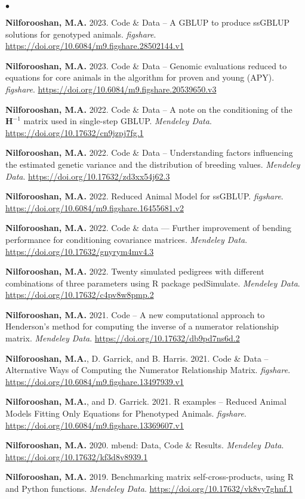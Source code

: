 \documentclass[margin,line]{res}
\newenvironment{list2}{
  \begin{list}{$\bullet$}{%
    \setlength{\itemsep}{0in}
    \setlength{\parsep}{0in} \setlength{\parskip}{0in}
    \setlength{\topsep}{0in} \setlength{\partopsep}{0in}
    \setlength{\leftmargin}{0.2in}}}
  {\end{list}}
\begin{document}
\begin{resume}
  \begin{list2}
    \item {\bf Nilforooshan, M.A.} 2023. Code \& Data -- A GBLUP to produce ssGBLUP solutions for genotyped animals. {\em figshare}. \url{https://doi.org/10.6084/m9.figshare.28502144.v1}
    \item {\bf Nilforooshan, M.A.} 2023. Code \& Data -- Genomic evaluations reduced to equations for core animals in the algorithm for proven and young (APY). {\em figshare}. \url{https://doi.org/10.6084/m9.figshare.20539650.v3}
    \item {\bf Nilforooshan, M.A.} 2022. Code \& Data -- A note on the conditioning of the $\mathbf H^{-1}$ matrix used in single-step GBLUP. {\em Mendeley Data}. \url{https://doi.org/10.17632/cn9jzpj7fg.1}
    \item {\bf Nilforooshan, M.A.} 2022. Code \& Data -- Understanding factors influencing the estimated genetic variance and the distribution of breeding values. {\em Mendeley Data}. \url{https://doi.org/10.17632/zd3xx54j62.3}
    \item {\bf Nilforooshan, M.A.} 2022. Reduced Animal Model for ssGBLUP. {\em figshare}. \url{https://doi.org/10.6084/m9.figshare.16455681.v2}
    \item {\bf Nilforooshan, M.A.} 2022. Code \& data --- Further improvement of bending performance for conditioning covariance matrices. {\em Mendeley Data}. \url{https://doi.org/10.17632/gnyrym4mv4.3}
    \item {\bf Nilforooshan, M.A.} 2022. Twenty simulated pedigrees with different combinations of three parameters using R package pedSimulate. {\em Mendeley Data}. \url{https://doi.org/10.17632/c4pv8w8pmp.2}
    \item {\bf Nilforooshan, M.A.} 2021. Code -- A new computational approach to Henderson's method for computing the inverse of a numerator relationship matrix. {\em Mendeley Data}. \url{https://doi.org/10.17632/db9pd7ns6d.2}
    \item {\bf Nilforooshan, M.A.}, D. Garrick, and B. Harris. 2021. Code \& Data -- Alternative Ways of Computing the Numerator Relationship Matrix. {\em figshare}. \url{https://doi.org/10.6084/m9.figshare.13497939.v1}
    \item {\bf Nilforooshan, M.A.}, and D. Garrick. 2021. R examples -- Reduced Animal Models Fitting Only Equations for Phenotyped Animals. {\em figshare}. \url{https://doi.org/10.6084/m9.figshare.13369607.v1}
    \item {\bf Nilforooshan, M.A.} 2020. mbend: Data, Code \& Results. {\em Mendeley Data}. \url{https://doi.org/10.17632/kf3d8v8939.1}
    \item {\bf Nilforooshan, M.A.} 2019. Benchmarking matrix self-cross-products, using R and Python functions. {\em Mendeley Data}. \url{https://doi.org/10.17632/vk8vy7ghnf.1}
  \end{list2}

\end{resume}
\end{document}

